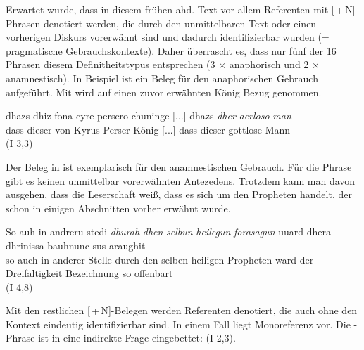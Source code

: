 Erwartet wurde, dass in diesem frühen ahd. Text vor allem Referenten mit [\,+\,N]-Phrasen denotiert werden, die durch den unmittelbaren Text oder einen vorherigen Diskurs vorerwähnt sind und dadurch identifizierbar wurden (=\,prag\-ma\-tische Gebrauchskontexte). Daher überrascht es, dass nur fünf der 16 Phrasen diesem Definitheitstypus entsprechen (3 $\times$ anaphorisch und 2 $\times$ anamnestisch). In Beispiel  ist ein Beleg für den  anaphorischen Gebrauch aufgeführt. Mit  wird auf einen  zuvor erwähnten König Bezug genommen.  

%

\begin{exe}
\ex \label{ex:I1051} \gll  dhazs dhiz fona cyre persero chuninge  [...]  dhazs \textit{dher} \textit{aerloso} \textit{man} \\
{dass} {dieser} {von} {Kyrus} {Perser} {König} [...] {dass} {dieser} {gottlose} {Mann} \\
\glt   {} (I 3,3)
\end{exe}

Der Beleg in  ist exemplarisch für den anamnestischen Gebrauch. Für die Phrase  gibt es keinen unmittelbar vorerwähnten Antezedens. Trotzdem kann man davon ausgehen, dass die Leserschaft weiß, dass es sich um den Propheten handelt, der schon in einigen Abschnitten vorher erwähnt wurde.
%

\begin{exe}
\ex \label{ex:I2524} \gll So auh in andreru stedi \textit{dhurah} \textit{dhen} \textit{selbun} \textit{heilegun} \textit{forasagun} uuard dhera dhrinissa bauhnunc sus araughit  \\
{so} {auch} {in} {anderer} {Stelle} {durch} {den} {selben} {heiligen} {Propheten} {ward} {der} {Dreifaltigkeit} {Bezeichnung} {so} {offenbart} \\
\glt   {} (I 4,8)
\end{exe}

Mit den restlichen [\,+\,N]-Belegen werden Referenten denotiert, die auch ohne den Kontext eindeutig identifizierbar sind. In einem Fall liegt Monoreferenz vor. Die -Phrase ist in eine indirekte Frage eingebettet:   (I 2,3). 

